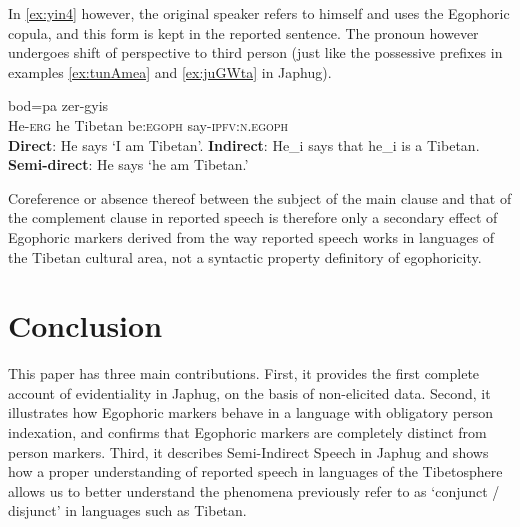 \documentclass[oldfontcommands,oneside,a4paper,11pt]{article}
\newcommand{\ipa}[1]{{\phon \mbox{#1}}} %
\newcommand{\bleu}[1]{{\color{blue}#1}}
\newcommand{\rouge}[1]{{\color{red}#1}}
\begin{document}
 
In \ref{ex:yin4} however, the original speaker refers to himself and uses the Egophoric copula, and this form is kept in the reported sentence. The pronoun however undergoes shift of perspective to third person (just like the possessive prefixes in examples \ref{ex:tunAmea} and \ref{ex:juGWta} in Japhug).

\begin{exe}
\ex \label{ex:yin4}
\gll   \ipa{kho-s} 	\rouge{\ipa{kho}} 	\ipa{bod=pa} 	\bleu{\ipa{yin}} 	\ipa{zer}-\ipa{gyis} \\
He-\textsc{erg} he Tibetan be:\textsc{egoph}  say-\textsc{ipfv:n.egoph} \\
\glt \textbf{Direct}: He says `\bleu{I am Tibetan}'.
\glt \textbf{Indirect}: He_i says that \rouge{he_i is a Tibetan}.
\glt  \textbf{Semi-direct}:  He says `\rouge{he} \bleu{am} Tibetan.'
   \end{exe}

Coreference or absence thereof between the subject of the main clause and that of the complement clause in reported speech is therefore only a secondary effect of Egophoric markers derived from the way reported speech works in languages of the Tibetan cultural area, not a syntactic property definitory of egophoricity. 
 
\section{Conclusion}
This paper has three main contributions. First, it provides the first complete account of evidentiality in Japhug, on the basis of non-elicited data. Second, it illustrates how Egophoric markers behave in a language with obligatory person indexation, and confirms that Egophoric markers are completely distinct from person markers. Third, it describes Semi-Indirect Speech in Japhug and shows how a proper understanding of reported speech in languages of the Tibetosphere allows us to better understand the phenomena previously refer to as `conjunct / disjunct' in languages such as Tibetan.



\end{document}
